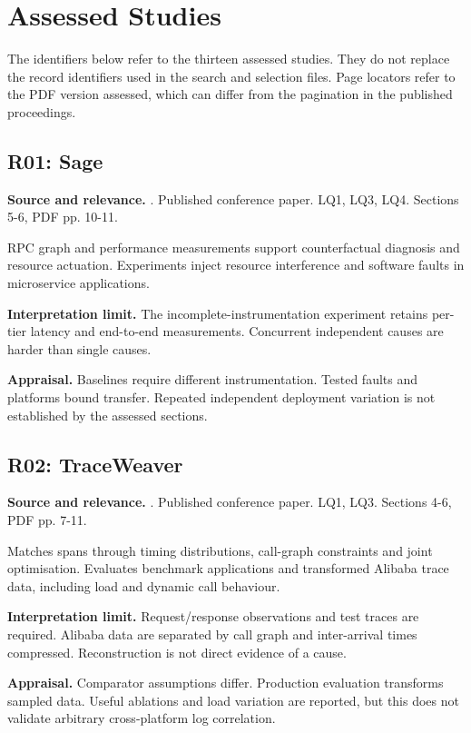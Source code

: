 \section{Assessed Studies}

The identifiers below refer to the thirteen assessed studies. They do not
replace the record identifiers used in the search and selection files.
Page locators refer to the PDF version assessed, which can differ from
the pagination in the published proceedings.

\subsection{R01: Sage}
\noindent\textbf{Source and relevance.} \parencite{gan2021sage}. Published conference paper. LQ1, LQ3, LQ4. Sections 5-6, PDF pp. 10-11.

RPC graph and performance measurements support counterfactual diagnosis and resource actuation. Experiments inject resource interference and software faults in microservice applications.

\noindent\textbf{Interpretation limit.} The incomplete-instrumentation experiment retains per-tier latency and end-to-end measurements. Concurrent independent causes are harder than single causes.

\noindent\textbf{Appraisal.} Baselines require different instrumentation. Tested faults and platforms bound transfer. Repeated independent deployment variation is not established by the assessed sections.

\subsection{R02: TraceWeaver}
\noindent\textbf{Source and relevance.} \parencite{ashok2024traceweaver}. Published conference paper. LQ1, LQ3. Sections 4-6, PDF pp. 7-11.

Matches spans through timing distributions, call-graph constraints and joint optimisation. Evaluates benchmark applications and transformed Alibaba trace data, including load and dynamic call behaviour.

\noindent\textbf{Interpretation limit.} Request/response observations and test traces are required. Alibaba data are separated by call graph and inter-arrival times compressed. Reconstruction is not direct evidence of a cause.

\noindent\textbf{Appraisal.} Comparator assumptions differ. Production evaluation transforms sampled data. Useful ablations and load variation are reported, but this does not validate arbitrary cross-platform log correlation.

